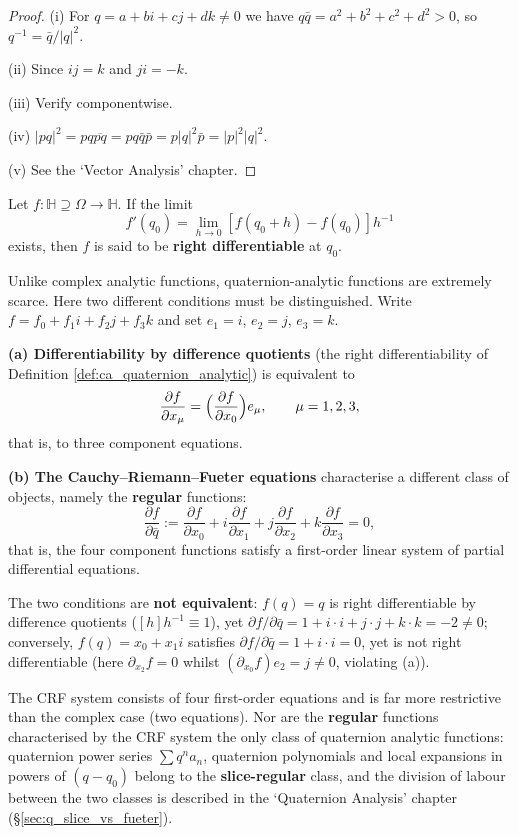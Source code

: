 \begin{proof}
(i) For $q = a + bi + cj + dk \neq 0$ we have $q\bar{q} = a^2 + b^2 + c^2 + d^2 > 0$, so $q^{-1} = \bar{q}/|q|^2$.

(ii) Since $ij = k$ and $ji = -k$.

(iii) Verify componentwise.

(iv) $|pq|^2 = pq \overline{pq} = pq \bar{q} \bar{p} = p|q|^2 \bar{p} = |p|^2 |q|^2$.

(v) See the `Vector Analysis' chapter.
\end{proof}

\begin{definition}\label{def:ca_quaternion_analytic}
Let $f: \mathbb{H} \supseteq \Omega \to \mathbb{H}$. If the limit
\[
f'(q_0) = \lim_{h \to 0} [f(q_0 + h) - f(q_0)] h^{-1}
\]
exists, then $f$ is said to be \textbf{right differentiable} at $q_0$.
\end{definition}

\begin{remark}\label{rem:ca_quaternion_analytic_rarity}
Unlike complex analytic functions, quaternion-analytic functions are extremely scarce. Here two different conditions must be distinguished. Write $f = f_0 + f_1 i + f_2 j + f_3 k$ and set $e_1 = i$, $e_2 = j$, $e_3 = k$.

\textbf{(a) Differentiability by difference quotients} (the right differentiability of Definition \ref{def:ca_quaternion_analytic}) is equivalent to
\[
\frac{\partial f}{\partial x_\mu} = \Bigl(\frac{\partial f}{\partial x_0}\Bigr) e_\mu, \qquad \mu = 1, 2, 3,
\]
that is, to three component equations.

\textbf{(b) The Cauchy--Riemann--Fueter equations} characterise a different class of objects, namely the \textbf{regular} functions:
\[
\frac{\partial f}{\partial \bar{q}} := \frac{\partial f}{\partial x_0} + i \frac{\partial f}{\partial x_1} + j \frac{\partial f}{\partial x_2} + k \frac{\partial f}{\partial x_3} = 0,
\]
that is, the four component functions satisfy a first-order linear system of partial differential equations.

The two conditions are \textbf{not equivalent}: $f(q) = q$ is right differentiable by difference quotients ($[h]h^{-1} \equiv 1$), yet $\partial f/\partial\bar q = 1 + i\cdot i + j\cdot j + k\cdot k = -2 \neq 0$; conversely, $f(q) = x_0 + x_1 i$ satisfies $\partial f/\partial\bar q = 1 + i\cdot i = 0$, yet is not right differentiable (here $\partial_{x_2}f = 0$ whilst $(\partial_{x_0}f)e_2 = j \neq 0$, violating (a)).

The CRF system consists of four first-order equations and is far more restrictive than the complex case (two equations). Nor are the \textbf{regular} functions characterised by the CRF system the only class of quaternion analytic functions: quaternion power series $\sum q^n a_n$, quaternion polynomials and local expansions in powers of $(q-q_0)$ belong to the \textbf{slice-regular} class, and the division of labour between the two classes is described in the `Quaternion Analysis' chapter (\S\ref{sec:q_slice_vs_fueter}).
\end{remark}

